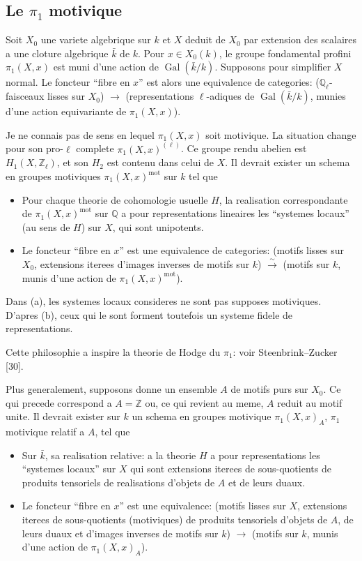 \documentclass[11pt,a4paper]{article}
\theoremstyle{plain}
\theoremstyle{definition}
\DeclareMathOperator{\Gal}{Gal}
\newcommand{\Q}{\mathbb{Q}}
\newcommand{\Z}{\mathbb{Z}}
\DeclareMathOperator{\mot}{mot}
\begin{document}
\subsection{Le $\pi_1$ motivique}

Soit $X_0$ une variete algebrique sur $k$ et $X$ deduit de $X_0$ par extension des scalaires a une cloture algebrique $\bar{k}$ de $k$. Pour $x \in X_0(k)$, le groupe fondamental profini $\pi_1(X, x)$ est muni d'une action de $\Gal(\bar{k}/k)$. Supposons pour simplifier $X$ normal. Le foncteur ``fibre en $x$'' est alors une equivalence de categories: ($\Q_{\ell}$-faisceaux lisses sur $X_0$) $\to$ (representations $\ell$-adiques de $\Gal(\bar{k}/k)$, munies d'une action equivariante de $\pi_1(X, x)$).

Je ne connais pas de sens en lequel $\pi_1(X, x)$ soit motivique. La situation change pour son pro-$\ell$ complete $\pi_1(X, x)^{(\ell)}$. Ce groupe rendu abelien est $H_1(X, \Z_\ell)$, et son $H_2$ est contenu dans celui de $X$. Il devrait exister un schema en groupes motiviques $\pi_1(X, x)^{\mot}$ sur $k$ tel que

\begin{itemize}
\item[(a)] Pour chaque theorie de cohomologie usuelle $H$, la realisation correspondante de $\pi_1(X, x)^{\mot}$ sur $\Q$ a pour representations lineaires les ``systemes locaux'' (au sens de $H$) sur $X$, qui sont unipotents.

\item[(b)] Le foncteur ``fibre en $x$'' est une equivalence de categories: (motifs lisses sur $X_0$, extensions iterees d'images inverses de motifs sur $k$) $\xrightarrow{\sim}$ (motifs sur $k$, munis d'une action de $\pi_1(X, x)^{\mot}$).
\end{itemize}

Dans (a), les systemes locaux consideres ne sont pas supposes motiviques. D'apres (b), ceux qui le sont forment toutefois un systeme fidele de representations.

Cette philosophie a inspire la theorie de Hodge du $\pi_1$: voir Steenbrink--Zucker [30].

Plus generalement, supposons donne un ensemble $A$ de motifs purs sur $X_0$. Ce qui precede correspond a $A = \Z$ ou, ce qui revient au meme, $A$ reduit au motif unite. Il devrait exister sur $k$ un schema en groupes motivique $\pi_1(X, x)_A$, $\pi_1$ motivique relatif a $A$, tel que

\begin{itemize}
\item[(a$'$)] Sur $\bar{k}$, sa realisation relative: a la theorie $H$ a pour representations les ``systemes locaux'' sur $X$ qui sont extensions iterees de sous-quotients de produits tensoriels de realisations d'objets de $A$ et de leurs duaux.

\item[(b$'$)] Le foncteur ``fibre en $x$'' est une equivalence: (motifs lisses sur $X$, extensions iterees de sous-quotients (motiviques) de produits tensoriels d'objets de $A$, de leurs duaux et d'images inverses de motifs sur $k$) $\to$ (motifs sur $k$, munis d'une action de $\pi_1(X, x)_A$).
\end{itemize}
\end{document}
